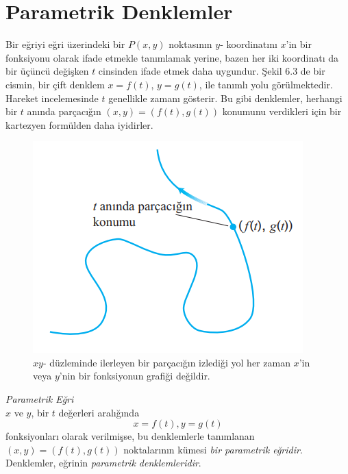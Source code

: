 \section{\protect Parametrik Denklemler}
Bir eğriyi eğri üzerindeki bir $P(x,y)$ noktasının $y$- koordinatını $x$'in bir fonksiyonu olarak ifade etmekle tanımlamak yerine, bazen her iki koordinatı da bir üçüncü değişken $t$ cinsinden ifade etmek daha uygundur. Şekil 6.3 de bir cismin, bir çift denklem $x=f(t)$, $y=g(t)$, ile tanımlı yolu görülmektedir. Hareket incelemesinde $t$ genellikle zamanı gösterir. Bu gibi denklemler, herhangi bir $t$ anında parçacığın $(x,y)=(f(t),g(t))$ konumunu verdikleri için bir kartezyen formülden daha iyidirler.

\begin{figure}[H]
	\centering
	\includegraphics[width=0.4\linewidth]{parametrik1.png}
	\caption{$xy$- düzleminde ilerleyen bir parçacığın izlediği yol her zaman $x$'in veya $y$'nin bir fonksiyonun grafiği değildir.}
	\label{fig:ornekresim}
\end{figure}
\begin{tanim}\textit{Parametrik Eğri}\\
	$x$ ve $y$, bir $t$ değerleri aralığında
	\begin{equation*}
	x=f(t),	y=g(t)
	\end{equation*}
fonksiyonları olarak verilmişse, bu denklemlerle tanımlanan $(x,y)=(f(t),g(t))$ noktalarının kümesi \textit{bir parametrik eğridir}. Denklemler, eğrinin \textit{parametrik denklemleridir}.
\end{tanim}

